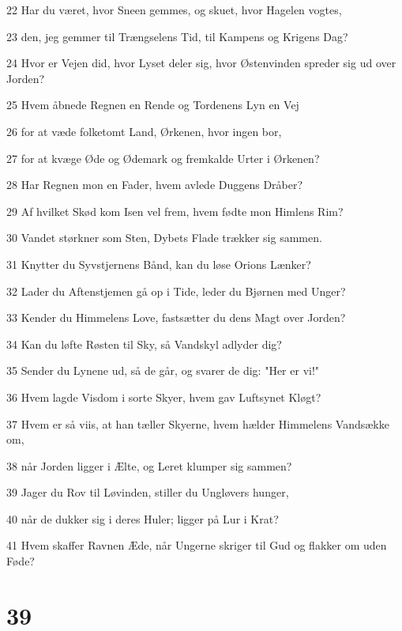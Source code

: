 \par 22 Har du været, hvor Sneen gemmes, og skuet, hvor Hagelen vogtes,
\par 23 den, jeg gemmer til Trængselens Tid, til Kampens og Krigens Dag?
\par 24 Hvor er Vejen did, hvor Lyset deler sig, hvor Østenvinden spreder sig ud over Jorden?
\par 25 Hvem åbnede Regnen en Rende og Tordenens Lyn en Vej
\par 26 for at væde folketomt Land, Ørkenen, hvor ingen bor,
\par 27 for at kvæge Øde og Ødemark og fremkalde Urter i Ørkenen?
\par 28 Har Regnen mon en Fader, hvem avlede Duggens Dråber?
\par 29 Af hvilket Skød kom Isen vel frem, hvem fødte mon Himlens Rim?
\par 30 Vandet størkner som Sten, Dybets Flade trækker sig sammen.
\par 31 Knytter du Syvstjernens Bånd, kan du løse Orions Lænker?
\par 32 Lader du Aftenstjemen gå op i Tide, leder du Bjørnen med Unger?
\par 33 Kender du Himmelens Love, fastsætter du dens Magt over Jorden?
\par 34 Kan du løfte Røsten til Sky, så Vandskyl adlyder dig?
\par 35 Sender du Lynene ud, så de går, og svarer de dig: "Her er vi!"
\par 36 Hvem lagde Visdom i sorte Skyer, hvem gav Luftsynet Kløgt?
\par 37 Hvem er så viis, at han tæller Skyerne, hvem hælder Himmelens Vandsække om,
\par 38 når Jorden ligger i Ælte, og Leret klumper sig sammen?
\par 39 Jager du Rov til Løvinden, stiller du Ungløvers hunger,
\par 40 når de dukker sig i deres Huler; ligger på Lur i Krat?
\par 41 Hvem skaffer Ravnen Æde, når Ungerne skriger til Gud og flakker om uden Føde?

\chapter{39}

